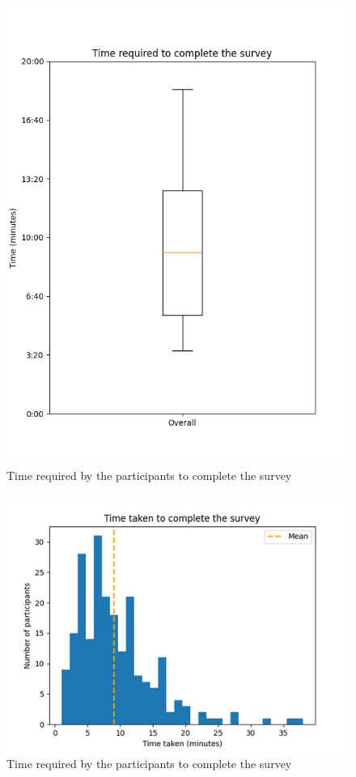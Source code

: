 \documentclass[%
class=scrreprt,
chapterprefix=false,%
open=right,%
twoside=false,%
paper=a4,%
logofile={Logo\_zentral\_farbig\_EN.png},%
thesistype=master,%
UKenglish,%
]{se2thesis}
\theoremstyle{definition}
\begin{document}
	\begin{figure}[t]
		\centering
		\includegraphics[width=\textwidth]{img/survey_time_box.png}
		\caption{Time required by the participants to complete the survey}
		\label{fig:survey_time_box}
	\end{figure}
	
	\begin{figure}[t]
		\centering
		\includegraphics[width=\textwidth]{img/survey_time_histogramm.png}
		\caption{Time required by the participants to complete the survey}
		\label{fig:survey_time_histogramm}
	\end{figure}
	
\end{document}
